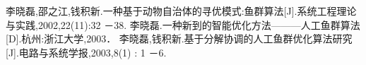 \documentclass[UTF8]{ctexart}
\begin{document}
\newpage
\begin{thebibliography}{123} 
 李晓磊,邵之江,钱积新.一种基于动物自治体的寻优模式:鱼群算法[J].系统工程理论与实践,2002,22(11):32 －38.
 李晓磊.一种新到的智能优化方法———人工鱼群算法[D].杭州:浙江大学,2003．
李晓磊,钱积新.基于分解协调的人工鱼群优化算法研究[J].电路与系统学报,2003,8(1) : 1 －6.
\end{thebibliography}

\end{document}
